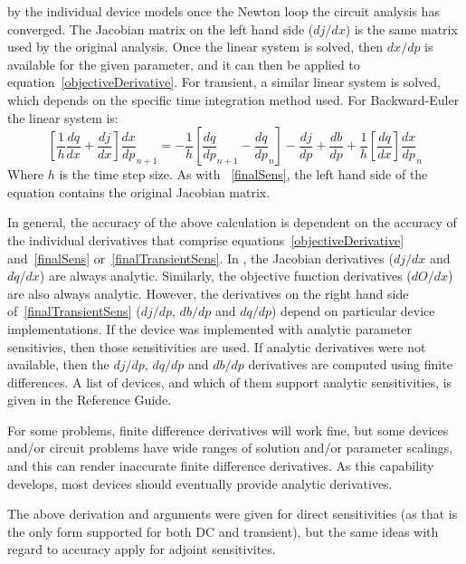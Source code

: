 by the individual device models once the Newton loop the circuit analysis has 
converged.  The Jacobian matrix on the left hand side ($dj/dx$) is the same matrix 
used by the original analysis.  Once the linear system is solved, then $dx/dp$ is
available for the given parameter, and it can then be applied to equation~\ref{objectiveDerivative}.
For transient, a similar linear system is solved, which depends on the specific
time integration method used.  For Backward-Euler the linear system is:
\begin{equation}
  \left[ \frac{1}{h} \frac{dq}{dx} 
  + \frac{dj}{dx} \right] \frac{dx}{dp}_{n+1} 
 =
  -\frac{1}{h} \left[ \frac{dq}{dp}_{n+1} - \frac{dq}{dp}_n \right] 
 - \frac{dj}{dp} 
 + \frac{db}{dp} 
 + \frac{1}{h} \left[ \frac{dq}{dx} \right] \frac{dx}{dp}_n 
 \label{finalTransientSens}
\end{equation}
\noindent Where $h$ is the time step size.  As with ~\ref{finalSens}, the left hand side 
of the equation contains the original Jacobian matrix.

In general, the accuracy of the above calculation is dependent on the accuracy of the 
individual derivatives that comprise equations~\ref{objectiveDerivative} and~\ref{finalSens} 
or~\ref{finalTransientSens}.
In \Xyce{}, the Jacobian derivatives ($dj/dx$ and $dq/dx$) are always analytic.  Similarly, the
objective function derivatives ($dO/dx$) are also always analytic.  However, the derivatives
on the right hand side of~\ref{finalTransientSens} ($dj/dp$, $db/dp$ and $dq/dp$) depend on particular
device implementations.  If the device was implemented with analytic parameter sensitivies,
then those sensitivities are used.  If analytic derivatives were not available, then
the $dj/dp$, $dq/dp$ and $db/dp$ derivatives are computed using finite differences.  
A list of \Xyce{} devices, and which of them support analytic sensitivities, is given in the \Xyce{} Reference 
Guide\ReferenceGuide{}.

For some problems, finite difference derivatives will work fine, but some devices and/or circuit
problems have wide ranges of solution and/or parameter scalings, and this can render inaccurate 
finite difference derivatives.  As this capability develops, most devices should
eventually provide analytic derivatives.

The above derivation and arguments were given for direct sensitivities (as that is the only
form supported for both DC and transient), but the same 
ideas with regard to accuracy apply for adjoint sensitivites.

